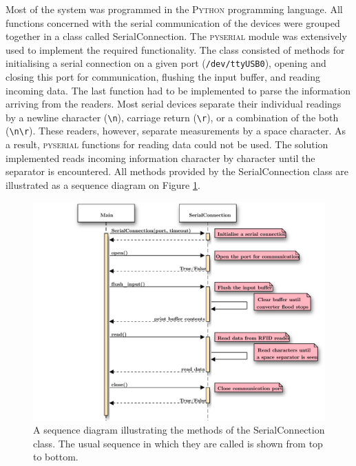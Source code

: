 Most of the system was programmed in the \textsc{Python} programming language. All functions concerned with the serial communication of the devices were grouped together in a class called \textsf{SerialConnection}. The \textsc{pyserial} module was extensively used to implement the required functionality. The class consisted of methods for initialising a serial connection on a given port (\verb!/dev/ttyUSB0!), opening and closing this port for communication, flushing the input buffer, and reading incoming data. The last function had to be implemented to parse the information arriving from the readers. Most serial devices separate their individual readings by a newline character (\verb!\n!), carriage return (\verb!\r!), or a combination of the both (\verb!\n\r!). These readers, however, separate measurements by a space character. As a result, \textsc{pyserial} functions for reading data could not be used. The solution implemented reads incoming information character by character until the separator is encountered. All methods provided by the \textsf{SerialConnection} class are illustrated as a sequence diagram on Figure \ref{fig:seqserial}.

\begin{figure}[h]
	\begin{center}
		\includegraphics[width=1\textwidth]{figures/seqdiag/serial}
		\caption{A sequence diagram illustrating the methods of the \textsf{SerialConnection} class. The usual sequence in which they are called is shown from top to bottom.}
		\label{fig:seqserial}
	\end{center}
\end{figure}


